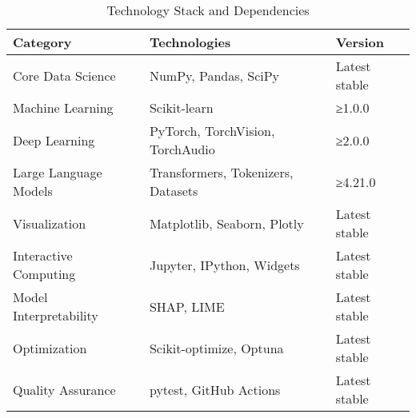 \begin{table}[H]
\centering
\caption{Technology Stack and Dependencies}
\label{tab:technology-stack}
\begin{tabular}{@{}lll@{}}
\toprule
\textbf{Category} & \textbf{Technologies} & \textbf{Version} \\
\midrule
Core Data Science & NumPy, Pandas, SciPy & Latest stable \\
Machine Learning & Scikit-learn & ≥1.0.0 \\
Deep Learning & PyTorch, TorchVision, TorchAudio & ≥2.0.0 \\
Large Language Models & Transformers, Tokenizers, Datasets & ≥4.21.0 \\
Visualization & Matplotlib, Seaborn, Plotly & Latest stable \\
Interactive Computing & Jupyter, IPython, Widgets & Latest stable \\
Model Interpretability & SHAP, LIME & Latest stable \\
Optimization & Scikit-optimize, Optuna & Latest stable \\
Quality Assurance & pytest, GitHub Actions & Latest stable \\
\bottomrule
\end{tabular}
\end{table}